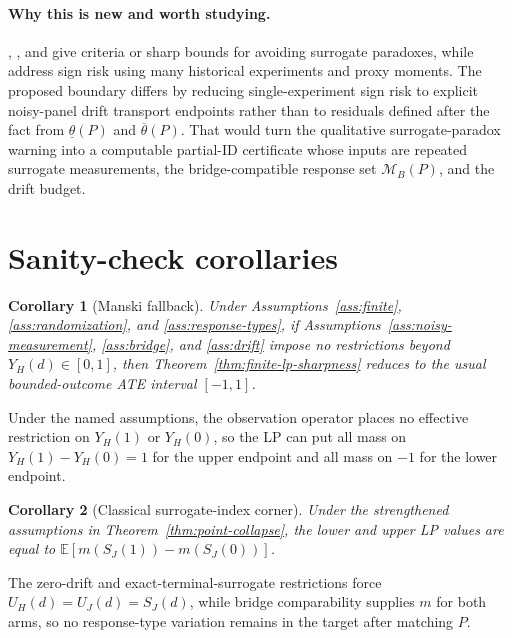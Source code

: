 \documentclass[11pt]{article}
\newcommand{\E}{\mathbb{E}}
\theoremstyle{definition}
\theoremstyle{plain}
\newtheorem{corollary}{Corollary}
\theoremstyle{remark}
\begin{document}
\paragraph{Why this is new and worth studying.}
\citet{ChenGengJia2007}, \citet{VanderWeele2013}, and \citet{MaYinLiuGeng2021} give criteria or sharp bounds for avoiding surrogate paradoxes, while \citet{BibautKallusEjdemyrZhao2023} address sign risk using many historical experiments and proxy moments.  The proposed boundary differs by reducing single-experiment sign risk to explicit noisy-panel drift transport endpoints rather than to residuals defined after the fact from \(\underline{\theta}(P)\) and \(\overline{\theta}(P)\).  That would turn the qualitative surrogate-paradox warning into a computable partial-ID certificate whose inputs are repeated surrogate measurements, the bridge-compatible response set \(\mathcal{M}_B(P)\), and the drift budget.

\section{Sanity-check corollaries}
\begin{corollary}[Manski fallback]\label{cor:manski}
Under Assumptions~\ref{ass:finite}, \ref{ass:randomization}, and \ref{ass:response-types}, if Assumptions~\ref{ass:noisy-measurement}, \ref{ass:bridge}, and \ref{ass:drift} impose no restrictions beyond \(Y_H(d)\in[0,1]\), then Theorem~\ref{thm:finite-lp-sharpness} reduces to the usual bounded-outcome ATE interval \([-1,1]\).
\end{corollary}
Under the named assumptions, the observation operator places no effective restriction on \(Y_H(1)\) or \(Y_H(0)\), so the LP can put all mass on \(Y_H(1)-Y_H(0)=1\) for the upper endpoint and all mass on \(-1\) for the lower endpoint.

\begin{corollary}[Classical surrogate-index corner]\label{cor:si}
Under the strengthened assumptions in Theorem~\ref{thm:point-collapse}, the lower and upper LP values are equal to \(\E[m(S_J(1))-m(S_J(0))]\).
\end{corollary}
The zero-drift and exact-terminal-surrogate restrictions force \(U_H(d)=U_J(d)=S_J(d)\), while bridge comparability supplies \(m\) for both arms, so no response-type variation remains in the target after matching \(P\).
\end{document}
